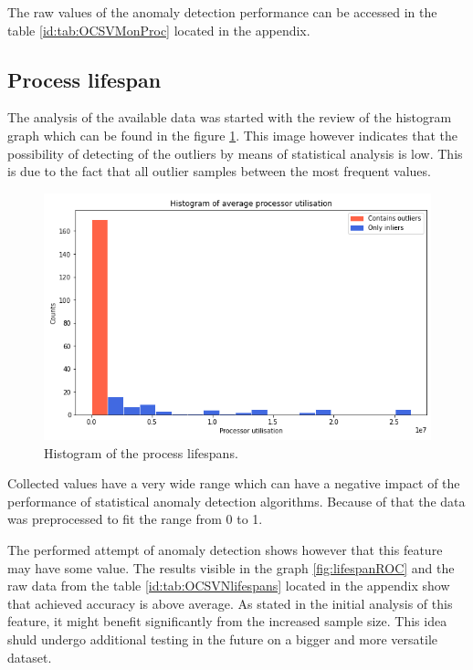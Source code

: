 \documentclass[a4paper,twoside,12pt]{book}
\begin{document}
The raw values of the anomaly detection performance can be accessed in the table \ref{id:tab:OCSVMonProc} located in the 
appendix. 

\subsection{Process lifespan}
The analysis of the available data was started with the review of the histogram graph which can be found in the 
figure \ref{fig:lifespanHist}. This image however indicates that the possibility of detecting of the outliers by means of statistical
analysis is low. This is due to the fact that all outlier samples between the most frequent values. 

\begin{figure}
	\centering
	\includegraphics[scale=0.9]{images/LifespanHist}
	\caption{Histogram of the process lifespans.}
	\label{fig:lifespanHist}
 \end{figure}


Collected values have a very wide range which can have a negative impact of the performance of statistical anomaly detection algorithms.
Because of that the data was preprocessed to fit the range from 0 to 1. 

The performed attempt of anomaly detection shows however that this feature may have some value. The results visible in the graph
\ref{fig:lifespanROC} and the raw data from the table \ref{id:tab:OCSVNlifespans} located in the appendix show that achieved accuracy 
is above average. As stated in the initial analysis of this feature, it might benefit significantly from the increased sample size.
This idea shuld undergo additional testing in the future on a bigger and more versatile dataset.
\end{document}
